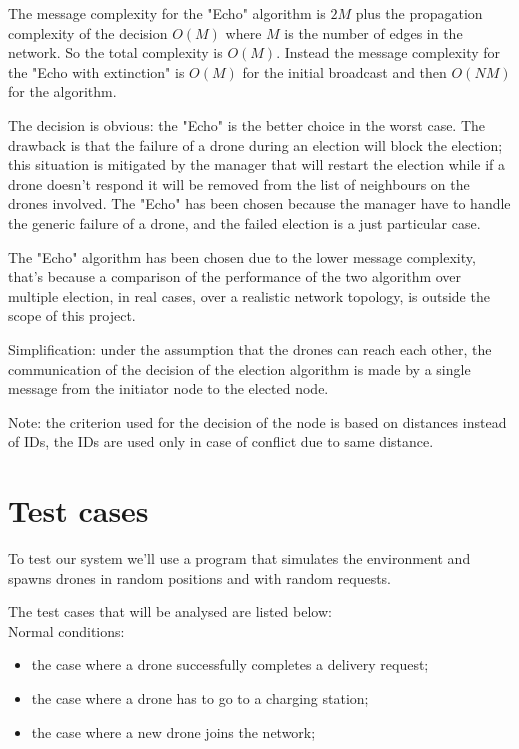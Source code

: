 \documentclass[a4paper, oneside]{memoir}
\begin{document}
The message complexity for the "Echo" algorithm is $2M$ plus the propagation complexity of the decision $O(M)$ where $M$ is the number of edges in the network. So the total complexity is $ O(M) $.
Instead the message complexity for the "Echo with extinction" is $O(M)$ for the initial broadcast and then $O(N M)$ for the algorithm.

The decision is obvious: the "Echo" is the better choice in the worst case. The drawback is that the failure of a drone during an election will block the election; this situation is mitigated by the manager that will restart the election while if a drone doesn't respond it will be removed from the list of neighbours on the drones involved. The "Echo" has been chosen because the manager have to handle the generic failure of a drone, and the failed election is a just particular case.

The "Echo" algorithm has been chosen due to the lower message complexity, that's because a comparison of the performance of the two algorithm over multiple election, in real cases, over a realistic network topology, is outside the scope of this project.

Simplification: under the assumption that the drones can reach each other, the communication of the decision of the election algorithm is made by a single message from the initiator node to the elected node.

Note: the criterion used for the decision of the node is based on distances instead of IDs, the IDs are used only in case of conflict due to same distance.


\section{Test cases}

To test our system we'll use a program that simulates the environment and spawns drones in random positions and with random requests.

The test cases that will be analysed are listed below:\\

Normal conditions:
\begin{itemize}
	\item the case where a drone successfully completes a delivery request;
	\item the case where a drone has to go to a charging station;
	\item the case where a new drone joins the network;
\end{itemize}
\end{document}

